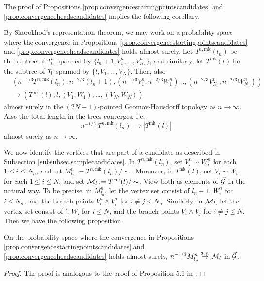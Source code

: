 The proof of Propositions \ref{prop.convergencestartingpointscandidates} and \ref{prop.convergenceheadscandidates} implies the following corollary.
\begin{corollary}
By Skorokhod's representation theorem, we may work on a probability space where the convergence in Propositions \ref{prop.convergencestartingpointscandidates} and \ref{prop.convergenceheadscandidates} holds almost surely. Let $T^{n,\text{mk}}(l_n)$ be the subtree of $T^n_{l_n}$ spanned by $\{l_n+1,V^n_1,\dots,V^n_{N_n}\}$, and similarly, let $T^{\text{mk}}(l)$ be the subtree of ${\mathcal T}_l$ spanned by $\{l,V_1,\dots,V_N\}$. Then, also 
\begin{align*}
    &\left(n^{-1/3}T^{n,\text{mk}}(l_n), n^{-2/3}(l_n+1), \left(n^{-2/3}V^n_1,n^{-2/3}W^n_1\right) \dots, \left(n^{-2/3}V^n_{N_n}, n^{-2/3}W^n_{N_n}\right)\right)\\
    &\to \left(T^{\text{mk}}(l), l, (V_1,W_1),\dots, (V_{N},W_{N})\right)
\end{align*}
almost surely in the $(2N+1)$-pointed Gromov-Hausdorff topology as $n\to \infty$. Also the total length in the trees converges, i.e.
$$n^{-1/3}\left|T^{n,\text{mk}}(l_n)\right|\to \left| T^{\text{mk}}(l)\right|$$
almost surely as $n\to\infty$.
\end{corollary}
We now identify the vertices that are part of a candidate as described in Subsection \ref{subsubsec.samplecandidates}. In $T^{n,\text{mk}}(l_n)$, set $V_i^n\sim W_i^n$ for each $1\leq i\leq N_n$, and set $M^n_{l_n}:=T^{n,\text{mk}}(l_n)/\sim$. Moreover, in $T^{\text{mk}}(l)$, set $V_i\sim W_i$ for each $1\leq i\leq N$, and set ${\mathcal M}_l:=T^{\text{mk}}(l)/\sim$. View both as elements of $\vec{{\mathcal G}}$ in the natural way. To be precise, in  $M^n_{l_n}$, let the vertex set consist of $l_n+1$, $W_i^n$ for $i\leq N_n$, and the branch points $V_i^n\wedge V_j^n$ for $i\neq j\leq N_n$. Similarly, in ${\mathcal M}_l$, let the vertex set consist of $l$, $W_i$ for $i\leq N$, and the branch points $V_i\wedge V_j$ for $i\neq j\leq N$. Then we have the following proposition.
\begin{proposition}
On the probability space where the convergence in Propositions \ref{prop.convergencestartingpointscandidates} and \ref{prop.convergenceheadscandidates} holds almost surely, 
$n^{-1/3}M^n_{l_n}\overset{a.s.}{\to} {\mathcal M}_l$
in $\vec{{\mathcal G}}$.
\end{proposition}
\begin{proof}
The proof is analogous to the proof of Proposition 5.6 in \cite{goldschmidtScalingLimitCritical2019}.
\end{proof}
